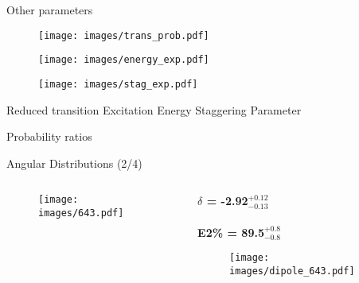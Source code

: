 \documentclass [aspectratio=169]{beamer}
\begin{document}
\begin{frame}{Other parameters}
\begin{center}
\begin{multicols}{3}
\begin{figure}
\texttt{[image: images/trans\_prob.pdf]}
\end{figure}
\begin{figure}
\texttt{[image: images/energy\_exp.pdf]}
\end{figure}
\begin{figure}
\texttt{[image: images/stag\_exp.pdf]}
\end{figure}
\end{multicols}
\color{violet} Reduced transition \hspace{55pt} Excitation Energy \hspace{45pt} Staggering Parameter
\end{center}
\vspace{-20pt}\color{violet} Probability ratios
\end{frame}

\begin{frame}{Angular Distributions (2/4)}
\begin{columns}[c]
\begin{column}{0.6\textwidth}
\begin{center}
\begin{figure}
\texttt{[image: images/643.pdf]}
\end{figure}
\end{center}
\end{column}
\begin{column}{0.4\textwidth}
\begin{center}
\textbf{$\delta$ = -2.92$^{{+{0.12}}}_{{-{0.13}}}$ \\~\\
E2\% = 89.5$^{{+{0.8}}}_{{-{0.8}}}$}
\begin{figure}
\texttt{[image: images/dipole\_643.pdf]}
\end{figure}
\end{center}
\end{column}
\end{columns}
\end{frame}
\end{document}
